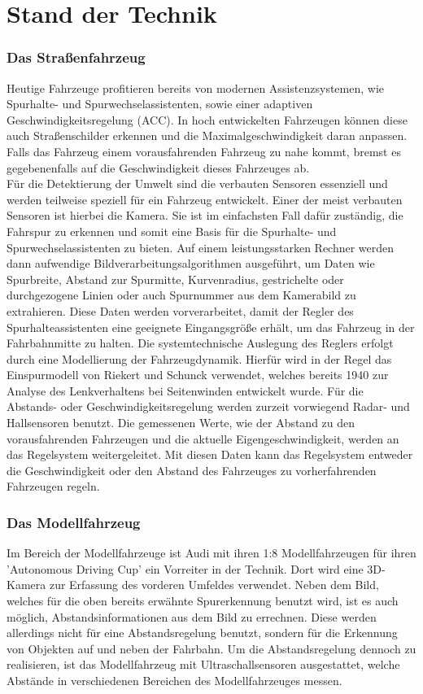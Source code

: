 \chapter{Stand der Technik}
\label{ch:Stand}
\subsection*{Das Straßenfahrzeug}
\label{ch:Stand_Strasse}
Heutige Fahrzeuge profitieren bereits von modernen Assistenzsystemen, wie Spur\-halte- und Spur\-wechsel\-assistenten, sowie einer adaptiven Geschwindigkeitsregelung (ACC). In hoch entwickelten Fahrzeugen können diese auch Straßenschilder erkennen und die Maximalgeschwindigkeit daran anpassen. Falls das Fahrzeug einem vorausfahrenden Fahrzeug zu nahe kommt, bremst es gegebenenfalls auf die Geschwindigkeit dieses Fahrzeuges ab.\\
Für die Detektierung der Umwelt sind die verbauten Sensoren essenziell und werden teilweise speziell für ein Fahrzeug entwickelt. Einer der meist verbauten Sensoren ist hierbei die Kamera. Sie ist im einfachsten Fall dafür zuständig, die Fahrspur zu erkennen und somit eine Basis für die Spurhalte- und Spurwechselassistenten zu bieten. Auf einem leistungsstarken Rechner werden dann aufwendige Bildverarbeitungsalgorithmen ausgeführt, um Daten wie Spurbreite, Abstand zur Spurmitte, Kurvenradius, gestrichelte oder durchgezogene Linien oder auch Spurnummer aus dem Kamerabild zu extrahieren. Diese Daten werden vorverarbeitet, damit der Reg\-ler des Spurhalteassistenten eine geeignete Eingangsgröße erhält, um das Fahrzeug in der Fahrbahnmitte zu halten. Die systemtechnische Auslegung des Reglers erfolgt durch eine Modellierung der Fahrzeugdynamik. Hierfür wird in der Regel das Einspurmodell von Riekert und Schunck verwendet, welches bereits 1940 zur Analyse des Lenkverhaltens bei Seitenwinden entwickelt wurde. \cite{Einspur} Für die Abstands- oder Geschwindigkeitsregelung werden zurzeit vorwiegend Radar- und Hallsensoren benutzt. Die gemessenen Werte, wie der Abstand zu den vorausfahrenden Fahrzeugen und die aktuelle Eigengeschwindigkeit, werden an das Regelsystem weiter\-ge\-lei\-tet. Mit diesen Daten kann das Regelsystem entweder die Geschwindigkeit oder den Abstand des Fahrzeuges zu vorherfahrenden Fahrzeugen regeln.\cite{WegAuto}
\subsection*{Das Modellfahrzeug}
Im Bereich der Modellfahrzeuge ist Audi mit ihren 1:8 Modellfahrzeugen für ihren 'Autonomous Driving Cup' ein Vorreiter in der Technik. Dort wird eine 3D-Kamera zur Erfassung des vorderen Umfeldes verwendet. Neben dem Bild, welches für die oben bereits erwähnte Spurerkennung benutzt wird, ist es auch möglich, Abstandsinformationen aus dem Bild zu errechnen. Diese werden allerdings nicht für eine Abstandsregelung benutzt, sondern für die Erkennung von Objekten auf und neben der Fahrbahn. Um die Abstandsregelung dennoch zu realisieren, ist das Modellfahrzeug mit Ultraschallsensoren ausgestattet, welche Abstände in verschiedenen Bereichen des Modellfahrzeuges messen. \cite{AUDI}
